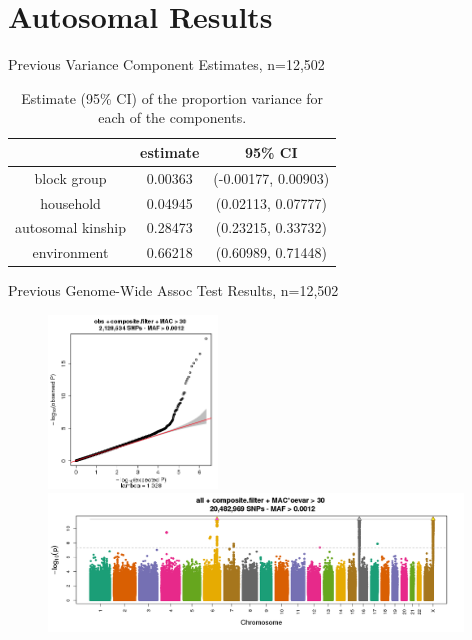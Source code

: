 \documentclass{beamer}
\begin{document}
\section{Autosomal Results}
\begin{frame}{Previous Variance Component Estimates, n=12,502}
\begin{table}[h!]
\centering
\begin{tabular}{ccc}
  \hline
& estimate & 95\% CI \\ \hline
block group & 0.00363 & (-0.00177, 0.00903)\\
household &0.04945 & (0.02113, 0.07777)\\
autosomal kinship &0.28473 &(0.23215, 0.33732)\\
environment & 0.66218& (0.60989, 0.71448) \\ \hline
\end{tabular}
\caption{Estimate (95\% CI) of the proportion variance for each of the components.}
\label{table:varComp}
\end{table}
\end{frame}

\begin{frame}{Previous Genome-Wide Assoc Test Results, n=12,502}
\centering
\begin{figure}
\includegraphics[height=4.6cm]{qq_obs_rbc.png}\\
\includegraphics[width=11cm]{pval_manh_single_2014-08-12_04-43-43_316987.png}
\end{figure}
\end{frame}
\end{document}
